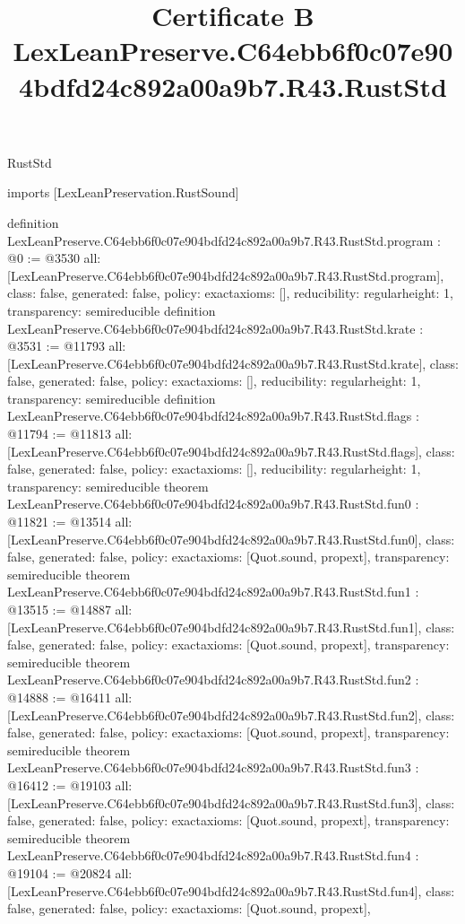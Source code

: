 \begin{lexlean}{RustStd}
\title{Certificate B LexLeanPreserve.C64ebb6f0c07e904bdfd24c892a00a9b7.R43.RustStd}
\begin{coremodule}
imports [LexLeanPreservation.RustSound]

definition LexLeanPreserve.C64ebb6f0c07e904bdfd24c892a00a9b7.R43.RustStd.program : @0 := @3530 {
  all: [LexLeanPreserve.C64ebb6f0c07e904bdfd24c892a00a9b7.R43.RustStd.program],
  class: false,
  generated: false,
  policy: exact{axioms: []},
  reducibility: regular{height: 1},
  transparency: semireducible
}
definition LexLeanPreserve.C64ebb6f0c07e904bdfd24c892a00a9b7.R43.RustStd.krate : @3531 := @11793 {
  all: [LexLeanPreserve.C64ebb6f0c07e904bdfd24c892a00a9b7.R43.RustStd.krate],
  class: false,
  generated: false,
  policy: exact{axioms: []},
  reducibility: regular{height: 1},
  transparency: semireducible
}
definition LexLeanPreserve.C64ebb6f0c07e904bdfd24c892a00a9b7.R43.RustStd.flags : @11794 := @11813 {
  all: [LexLeanPreserve.C64ebb6f0c07e904bdfd24c892a00a9b7.R43.RustStd.flags],
  class: false,
  generated: false,
  policy: exact{axioms: []},
  reducibility: regular{height: 1},
  transparency: semireducible
}
theorem LexLeanPreserve.C64ebb6f0c07e904bdfd24c892a00a9b7.R43.RustStd.fun0 : @11821 := @13514 {
  all: [LexLeanPreserve.C64ebb6f0c07e904bdfd24c892a00a9b7.R43.RustStd.fun0],
  class: false,
  generated: false,
  policy: exact{axioms: [Quot.sound, propext]},
  transparency: semireducible
}
theorem LexLeanPreserve.C64ebb6f0c07e904bdfd24c892a00a9b7.R43.RustStd.fun1 : @13515 := @14887 {
  all: [LexLeanPreserve.C64ebb6f0c07e904bdfd24c892a00a9b7.R43.RustStd.fun1],
  class: false,
  generated: false,
  policy: exact{axioms: [Quot.sound, propext]},
  transparency: semireducible
}
theorem LexLeanPreserve.C64ebb6f0c07e904bdfd24c892a00a9b7.R43.RustStd.fun2 : @14888 := @16411 {
  all: [LexLeanPreserve.C64ebb6f0c07e904bdfd24c892a00a9b7.R43.RustStd.fun2],
  class: false,
  generated: false,
  policy: exact{axioms: [Quot.sound, propext]},
  transparency: semireducible
}
theorem LexLeanPreserve.C64ebb6f0c07e904bdfd24c892a00a9b7.R43.RustStd.fun3 : @16412 := @19103 {
  all: [LexLeanPreserve.C64ebb6f0c07e904bdfd24c892a00a9b7.R43.RustStd.fun3],
  class: false,
  generated: false,
  policy: exact{axioms: [Quot.sound, propext]},
  transparency: semireducible
}
theorem LexLeanPreserve.C64ebb6f0c07e904bdfd24c892a00a9b7.R43.RustStd.fun4 : @19104 := @20824 {
  all: [LexLeanPreserve.C64ebb6f0c07e904bdfd24c892a00a9b7.R43.RustStd.fun4],
  class: false,
  generated: false,
  policy: exact{axioms: [Quot.sound, propext]},
}
\end{coremodule}
\end{lexlean}
